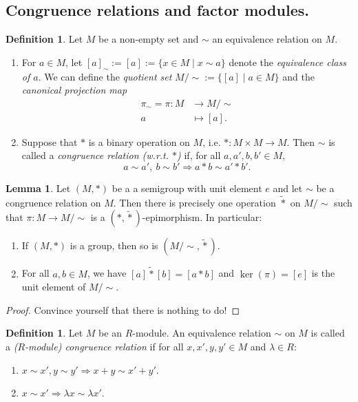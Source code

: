 \documentclass[12pt,a4paper]{report}
\theoremstyle{definition}
\newtheorem{lemma}[theorem]{Lemma}
\newtheorem{defn}[theorem]{Definition}
\theoremstyle{num.custom-title}
\DeclareMathOperator{\imp}{\Rightarrow}
\begin{document}
\subsection{Congruence relations and factor modules.}

\begin{defn}
Let $M$ be a non-empty set and $\sim$ an equivalence relation on $M$.
\begin{enumerate}
\item For $a \in M$, let $[a]_\sim := [a] := \{x \in M \mid x \sim a\}$ denote the \emph{equivalence class of $a$}. We can define the \emph{quotient set} $M/{\sim} := \{[a] \mid a \in M\}$ and the \emph{canonical projection map}
\begin{align*}
\pi_\sim = \pi \colon M &\to M/{\sim} \\
a &\mapsto [a].
\end{align*}
\item Suppose that $*$ is a binary operation on $M$, i.e. $*: M \times M \to M$. Then $\sim$ is called a \emph{congruence relation (w.r.t. $*$)} if, for all $a,a',b,b' \in M$,
\[
a \sim a', \ b \sim b' \imp a*b \sim a'*b'.
\]
\end{enumerate}
\end{defn}

\begin{lemma}\label{lemma_operation_on_factor}
Let $(M,*)$ be a a semigroup with unit element $e$ and let $\sim$ be a congruence relation on $M$. Then there is precisely one operation $\tilde{*}$ on $M/{\sim}$ such that $\pi : M \to M/{\sim}$ is a $(*,\tilde{*})$-epimorphism. In particular:
\begin{enumerate}
\item If $(M,*)$ is a group, then so is $(M/{\sim},\tilde{*})$.
\item For all $a,b \in M$, we have $[a] \tilde{*} [b] = [a*b]$ and $\ker(\pi) = [e]$ is the unit element of $M/{\sim}$.
\end{enumerate}
\begin{proof}
Convince yourself that there is nothing to do!
\end{proof}
\end{lemma}

\begin{defn}
Let $M$ be an $R$-module. An equivalence relation $\sim$ on $M$ is called a \emph{($R$-module) congruence relation} if for all $x,x',y,y' \in M$ and $\lambda \in R$:
\begin{enumerate}
\item $x \sim x', y \sim y' \imp x+y \sim x'+y'$.
\item $x \sim x' \imp \lambda x \sim \lambda x'$.
\end{enumerate}
\end{defn}
\end{document}

